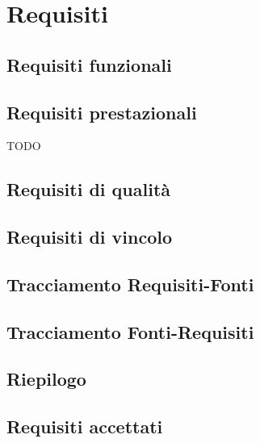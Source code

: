 %


\section{Requisiti}

\subsection{Requisiti funzionali}

\subsection{Requisiti prestazionali}

\begin{center}
\begin{small}
	\begin{tabbing}
		TODO
	\end{tabbing}
\end{small}
\end{center}

\subsection{Requisiti di qualità}

\subsection{Requisiti di vincolo}

\subsection{Tracciamento Requisiti-Fonti}

\subsection{Tracciamento Fonti-Requisiti}

\subsection{Riepilogo}

\subsection{Requisiti accettati}
